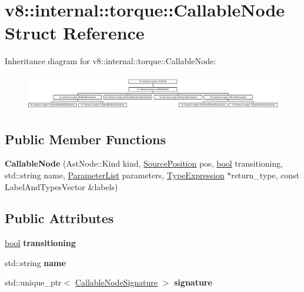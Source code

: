 \hypertarget{structv8_1_1internal_1_1torque_1_1CallableNode}{}\section{v8\+:\+:internal\+:\+:torque\+:\+:Callable\+Node Struct Reference}
\label{structv8_1_1internal_1_1torque_1_1CallableNode}
Inheritance diagram for v8\+:\+:internal\+:\+:torque\+:\+:Callable\+Node\+:\begin{figure}[H]
\begin{center}
\leavevmode
\includegraphics[height=1.577465cm]{structv8_1_1internal_1_1torque_1_1CallableNode}
\end{center}
\end{figure}
\subsection*{Public Member Functions}
\begin{DoxyCompactItemize}
\item 
\mbox{\label{structv8_1_1internal_1_1torque_1_1CallableNode_aabf92b1de406b05d5f2416a058f472c8}} 
{\bfseries Callable\+Node} (Ast\+Node\+::\+Kind kind, \mbox{\hyperlink{structv8_1_1internal_1_1torque_1_1SourcePosition}{Source\+Position}} pos, \mbox{\hyperlink{classbool}{bool}} transitioning, std\+::string name, \mbox{\hyperlink{structv8_1_1internal_1_1torque_1_1ParameterList}{Parameter\+List}} parameters, \mbox{\hyperlink{structv8_1_1internal_1_1torque_1_1TypeExpression}{Type\+Expression}} $\ast$return\+\_\+type, const Label\+And\+Types\+Vector \&labels)
\end{DoxyCompactItemize}
\subsection*{Public Attributes}
\begin{DoxyCompactItemize}
\item 
\mbox{\label{structv8_1_1internal_1_1torque_1_1CallableNode_a20cfa64281206c16cf3047eec6c9dddb}} 
\mbox{\hyperlink{classbool}{bool}} {\bfseries transitioning}
\item 
\mbox{\label{structv8_1_1internal_1_1torque_1_1CallableNode_a11e6f42a793bee107b05ade9cad31c92}} 
std\+::string {\bfseries name}
\item 
\mbox{\label{structv8_1_1internal_1_1torque_1_1CallableNode_ae2b508e9c055c07cad99f94f4a42dc2f}} 
std\+::unique\+\_\+ptr$<$ \mbox{\hyperlink{structv8_1_1internal_1_1torque_1_1CallableNodeSignature}{Callable\+Node\+Signature}} $>$ {\bfseries signature}
\end{DoxyCompactItemize}
